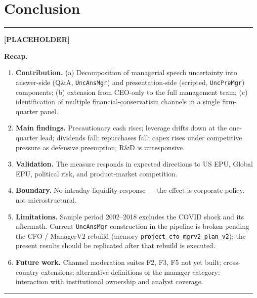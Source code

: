 \documentclass[11pt,a4paper,twocolumn]{article}
\newenvironment{placeholder}{%
  \par\medskip\noindent%
  {\color{placeholderaccent}\rule{\linewidth}{0.4pt}}\par%
  \noindent\textbf{\color{placeholderaccent}[PLACEHOLDER]}\par%
  \smallskip\itshape%
}{%
  \par\upshape\smallskip%
  {\color{placeholderaccent}\rule{\linewidth}{0.4pt}}\par\medskip%
}
\begin{document}
\clearpage

\section{Conclusion}
\label{sec:conclusion}
\begin{placeholder}
\textbf{Recap.}
\begin{enumerate}
  \item \textbf{Contribution.} (a) Decomposition of managerial speech
        uncertainty into answer-side (Q\&A, \texttt{UncAnsMgr}) and
        presentation-side (scripted, \texttt{UncPreMgr}) components;
        (b) extension from CEO-only to the full management team;
        (c) identification of multiple financial-conservatism channels
        in a single firm-quarter panel.
  \item \textbf{Main findings.} Precautionary cash rises; leverage
        drifts down at the one-quarter lead; dividends fall;
        repurchases fall; capex rises under competitive pressure as
        defensive preemption; R\&D is unresponsive.
  \item \textbf{Validation.} The measure responds in expected
        directions to US EPU, Global EPU, political risk, and
        product-market competition.
  \item \textbf{Boundary.} No intraday liquidity response --- the
        effect is corporate-policy, not microstructural.
  \item \textbf{Limitations.} Sample period 2002--2018 excludes the
        COVID shock and its aftermath. Current \texttt{UncAnsMgr}
        construction in the pipeline is broken pending the
        CFO / ManagerV2 rebuild (memory
        \texttt{project\_cfo\_mgrv2\_plan\_v2}); the present results
        should be replicated after that rebuild is executed.
  \item \textbf{Future work.} Channel moderation suites F2, F3, F5
        not yet built; cross-country extensions; alternative
        definitions of the manager category; interaction with
        institutional ownership and analyst coverage.
\end{enumerate}
\end{placeholder}

\clearpage



\end{document}
